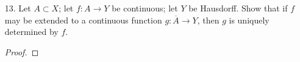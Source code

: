 \documentclass[12pt]{article}
\theoremstyle{definition}
\newcommand{\abs}[1]{\lvert #1 \rvert}
\begin{document}
\begin{enumerate}
\begin{proof}
\begin{equation*}
\begin{split}
                        &\Rightarrow \abs{y(b-a)+a-c(b-a)-a}< \varepsilon \\
                        &\Rightarrow \abs{f^{-1}(y)-f^{-1}(c)}<\varepsilon.
                    \end{split}
                \end{equation*}
                Therefore $(a, b)$ is homeomorphic to $(0, 1)$. Lastly, we note
                that both $f$ and $f^{-1}$ are defined on the end points of
                their respective intervals and that $f(a)=0$, $f(b)=1$,
                $f^{-1}(0)=a$, and $f^{-1}(1)=b$. Hence, the given function,
                $f$, also shows that $[a, b]$ and $[0, 1]$ are homeomorphic.
            \end{proof}
        \item[13.] Let $A\subset X$; let $f:A\to Y$ be continuous; let $Y$ be
            Hausdorff. Show that if $f$ may be extended to a continuous
            function $g:\overline{A}\to Y$, then $g$ is uniquely determined by
            $f$.
            \begin{proof}
                
            \end{proof}
    \end{enumerate}
\end{document}
